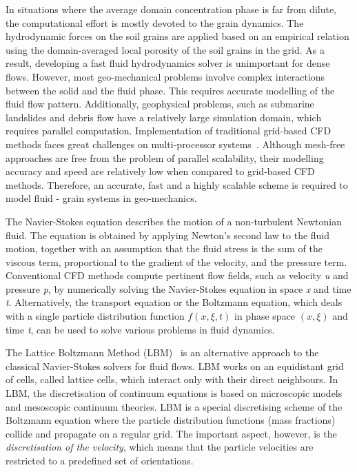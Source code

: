 In situations where the average domain concentration phase is far from dilute, 
the computational effort is mostly devoted to the grain dynamics. The 
hydrodynamic forces on the soil grains are applied based on an empirical 
relation using the domain-averaged local porosity of the soil grains in the 
grid. As a result, developing a fast fluid hydrodynamics solver is unimportant 
for dense flows. However, most geo-mechanical problems involve complex 
interactions between the solid and the fluid phase. This requires accurate 
modelling of the fluid flow pattern. Additionally, geophysical problems, such 
as submarine landslides and debris flow have a relatively large simulation 
domain, which requires parallel computation. Implementation of traditional 
grid-based CFD methods faces great challenges on multi-processor 
systems~\citep{Xiong2014}. Although mesh-free approaches are free from the 
problem of parallel scalability, their modelling accuracy and speed are 
relatively low when compared to grid-based CFD methods. Therefore, an accurate, 
fast and a highly scalable scheme is required to model fluid - grain systems in 
geo-mechanics. 
 
The Navier-Stokes equation describes the motion of a non-turbulent Newtonian 
fluid. The equation is obtained by applying Newton's second law to the fluid 
motion, together with an assumption that the fluid stress is the sum of the 
viscous term, proportional to the gradient of the velocity, and the pressure 
term. Conventional CFD methods compute pertinent flow fields, such as velocity 
\textit{u} and pressure \textit{p}, by numerically solving the Navier-Stokes 
equation in space \textit{x} and time \textit{t}. Alternatively, the transport 
equation or the Boltzmann equation, which deals with a single particle 
distribution function $f(x,\xi,t)$ in phase space $(x,\xi)$ and time 
\textit{t}, can be used to solve various problems in fluid dynamics. 

The Lattice Boltzmann Method
(LBM)~\citep{He1997a,He1997b,Chen1998a,Mei2000,Han2007a,Zhou2012}
is an alternative approach to the classical Navier-Stokes solvers for fluid 
flows. LBM works on an equidistant grid of cells, called lattice cells, which 
interact only with their direct neighbours. In LBM, the discretisation of 
continuum equations is based on microscopic models and mesoscopic continuum 
theories. LBM is a special discretising scheme of the Boltzmann equation where 
the particle distribution functions (mass fractions) collide and propagate on a 
regular grid. The important aspect, however, is the \textit{discretisation of 
the velocity}, which means that the particle velocities are restricted to a 
predefined set of orientations.


